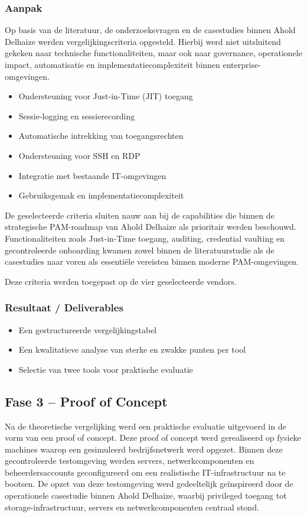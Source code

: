 \subsubsection{Aanpak}
Op basis van de literatuur, de onderzoeksvragen en de casestudies binnen Ahold Delhaize werden vergelijkingscriteria opgesteld. Hierbij werd niet uitsluitend gekeken naar technische functionaliteiten, maar ook naar governance, operationele impact, automatisatie en implementatiecomplexiteit binnen enterprise-omgevingen.
\begin{itemize}
	\item Ondersteuning voor Just-in-Time (JIT) toegang
	\item Sessie-logging en sessierecording
	\item Automatische intrekking van toegangsrechten
	\item Ondersteuning voor SSH en RDP
	\item Integratie met bestaande IT-omgevingen
	\item Gebruiksgemak en implementatiecomplexiteit
\end{itemize}

De geselecteerde criteria sluiten nauw aan bij de capabilities die binnen de strategische PAM-roadmap van Ahold Delhaize als prioritair werden beschouwd. Functionaliteiten zoals Just-in-Time toegang, auditing, credential vaulting en gecontroleerde onboarding kwamen zowel binnen de literatuurstudie als de casestudies naar voren als essentiële vereisten binnen moderne PAM-omgevingen.

Deze criteria werden toegepast op de vier geselecteerde vendors.

\subsubsection{Resultaat / Deliverables}
\begin{itemize}
	\item Een gestructureerde vergelijkingstabel
	\item Een kwalitatieve analyse van sterke en zwakke punten per tool
	\item Selectie van twee tools voor praktische evaluatie
\end{itemize}

\subsection{Fase 3 – Proof of Concept}
Na de theoretische vergelijking werd een praktische evaluatie uitgevoerd in de vorm van een proof of concept. Deze proof of concept werd gerealiseerd op fysieke machines waarop een gesimuleerd bedrijfsnetwerk werd opgezet. Binnen deze gecontroleerde testomgeving werden servers, netwerkcomponenten en beheerdersaccounts geconfigureerd om een realistische IT-infrastructuur na te bootsen.
De opzet van deze testomgeving werd gedeeltelijk geïnspireerd door de operationele casestudie binnen Ahold Delhaize, waarbij privileged toegang tot storage-infrastructuur, servers en netwerkcomponenten centraal stond.
